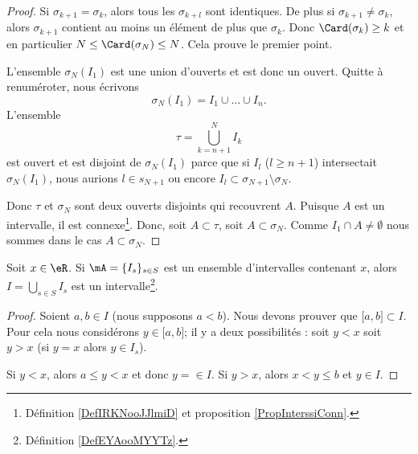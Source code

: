 \begin{proof}
	Si \( \sigma_{k+1}=\sigma_k\), alors tous les \( \sigma_{k+l}\) sont identiques. De plus si \( \sigma_{k+1}\neq \sigma_k\), alors \( \sigma_{k+1}\) contient au moins un élément de plus que \( \sigma_k\). Donc \( \Card(\sigma_k)\geq k\) et en particulier \( N\leq \Card(\sigma_N)\leq N\). Cela prouve le premier point.

	L'ensemble \( \sigma_N(I_1)\) est une union d'ouverts et est donc un ouvert. Quitte à renuméroter, nous écrivons
	\begin{equation}
		\sigma_N(I_1)=I_1\cup \ldots \cup I_n.
	\end{equation}
	L'ensemble
	\begin{equation}
		\tau=\bigcup_{k=n+1}^NI_k
	\end{equation}
	est ouvert et est disjoint de \( \sigma_N(I_1)\) parce que si \( I_l\) (\( l\geq n+1\)) intersectait \( \sigma_N(I_1)\), nous aurions \( l\in s_{N+1}\) ou encore \( I_l\subset \sigma_{N+1}\setminus\sigma_N\).

	Donc \( \tau\) et \( \sigma_N\) sont deux ouverts disjoints qui recouvrent \( A\). Puisque \( A\) est un intervalle, il est connexe\footnote{Définition \ref{DefIRKNooJJlmiD} et proposition \ref{PropInterssiConn}.}. Donc, soit \( A\subset \tau\), soit \( A\subset \sigma_N\). Comme \( I_1\cap A\neq \emptyset\) nous sommes dans le cas \( A\subset \sigma_N\).
\end{proof}

\begin{lemma}       \label{LEMooGHPTooKgFvGb}
	Soit \( x\in \eR\). Si \( \mA=\{ I_s \}_{s\in S}\) est un ensemble d'intervalles contenant \( x\), alors \( I=\bigcup_{s\in S}I_s\) est un intervalle\footnote{Définition \ref{DefEYAooMYYTz}.}.
\end{lemma}

\begin{proof}
	Soient \( a,b\in I \) (nous supposons \( a<b\)). Nous devons prouver que \( \mathopen[ a , b \mathclose]\subset I\). Pour cela nous considérons \( y\in \mathopen[ a , b \mathclose]\); il y a deux possibilités : soit \( y<x\) soit \( y>x\) (si \( y=x\) alors \( y\in I_s\)).

	Si \( y<x\), alors \( a\leq y<x\) et donc \( y=\in I\). Si \( y>x\), alors \( x<y\leq b\) et \( y\in I\).
\end{proof}

